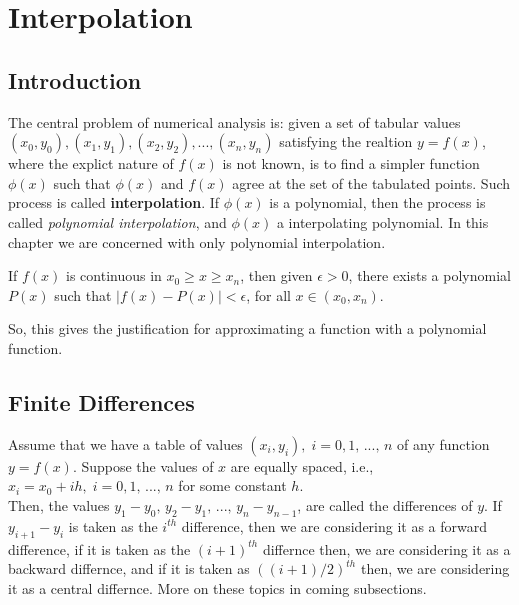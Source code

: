 \documentclass[aima203_lecturenotes_ku.tex]{subfiles}
\begin{document}
\chapter{Interpolation}
\section{Introduction}
The central problem of numerical analysis is: given a set of tabular values $(x_0,y_0), (x_1,y_1),(x_2,y_2),...,(x_n,y_n)$ satisfying the realtion $y=f(x)$, where the explict nature of $f(x)$ is not known, is to find a simpler function $\phi (x)$ such that $\phi (x)$ and $f(x)$ agree at the set of the tabulated points. Such process is called \textbf{interpolation}. If $\phi (x)$ is a polynomial, then the process is called \textit{polynomial interpolation}, and $\phi (x)$ a interpolating polynomial. In this chapter we are concerned with only polynomial interpolation.

\begin{theorem}
If $f(x)$ is continuous in $x_0 \geq x \geq x_n$, then given $\epsilon >0$, there exists a polynomial $P(x)$ such that $|f(x)-P(x)| < \epsilon$, for all $x \in (x_0, x_n)$.
\end{theorem}
So, this gives the justification for approximating a function with a polynomial function.

\section{Finite Differences}
Assume that we have a table of values $(x_i,y_i), \; i=0,1,\, ..., \, n$ of any function $y=f(x)$. Suppose the values of $x$ are equally spaced, i.e., $x_i=x_0 + ih, \; i=0,1,\, ..., \, n$ for some constant $h$. \\
Then, the values $y_1 - y_0, \, y_2 - y_1, \, ..., \, y_n - y_{n-1}$, are called the differences of $y$. If $y_{i+1} - y_i$ is taken as the $i^{th}$ difference, then we are considering it as a forward difference, if it is taken as the $(i+1)^{th}$ differnce then, we are considering it as a backward differnce, and if it is taken as $((i+1)/2)^{th}$ then, we are considering it as a central differnce. More on these topics in coming subsections.
\end{document}
